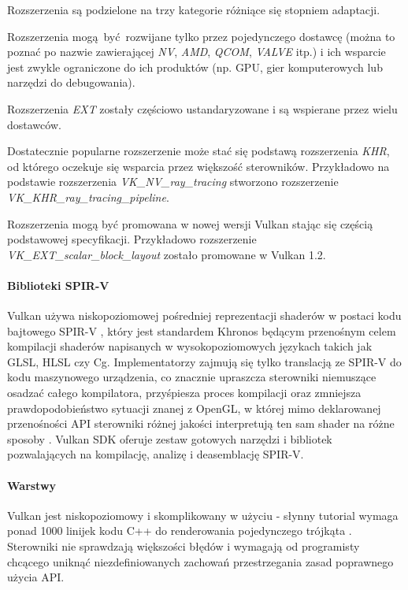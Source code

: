 Rozszerzenia są podzielone na trzy kategorie różniące się stopniem adaptacji.

Rozszerzenia mogą być rozwijane tylko przez pojedynczego dostawcę (można to poznać po nazwie zawierającej \textit{NV}, \textit{AMD}, \textit{QCOM}, \textit{VALVE} itp.) i ich wsparcie jest zwykle ograniczone do ich produktów (np. GPU, gier komputerowych lub narzędzi do debugowania).

Rozszerzenia \textit{EXT} zostały częściowo ustandaryzowane i są wspierane przez wielu dostawców.

Dostatecznie popularne rozszerzenie może stać się podstawą rozszerzenia \textit{KHR}, od którego oczekuje się wsparcia przez większość sterowników.
Przykładowo na podstawie rozszerzenia \textit{VK\_NV\_ray\_tracing} stworzono rozszerzenie \textit{VK\_KHR\_ray\_tracing\_pipeline}.

Rozszerzenia mogą być promowana w nowej wersji Vulkan stając się częścią podstawowej specyfikacji.
Przykładowo rozszerzenie \textit{VK\_EXT\_scalar\_block\_layout} zostało promowane w Vulkan 1.2.

\paragraph{Biblioteki SPIR-V}

Vulkan używa niskopoziomowej pośredniej reprezentacji shaderów w postaci kodu bajtowego SPIR-V \cite{SPIRVSPEC}, który jest standardem Khronos będącym przenośnym celem kompilacji shaderów napisanych w wysokopoziomowych językach takich jak GLSL, HLSL czy Cg.
Implementatorzy zajmują się tylko translacją ze SPIR-V do kodu maszynowego urządzenia, co znacznie upraszcza sterowniki niemuszące osadzać całego kompilatora, przyśpiesza proces kompilacji oraz zmniejsza prawdopodobieństwo sytuacji znanej z OpenGL, w której mimo deklarowanej przenośności API sterowniki różnej jakości interpretują ten sam shader na różne sposoby \cite{GLSLBAD}.
Vulkan SDK oferuje zestaw gotowych narzędzi i bibliotek pozwalających na kompilację, analizę i deasemblację SPIR-V.

\paragraph{Warstwy}

Vulkan jest niskopoziomowy i skomplikowany w użyciu - słynny tutorial wymaga ponad 1000 linijek kodu C++ do renderowania pojedynczego trójkąta  \cite{VULKANTUTORIAL}.
Sterowniki nie sprawdzają większości błędów i wymagają od programisty chcącego uniknąć niezdefiniowanych zachowań przestrzegania zasad poprawnego użycia API.

